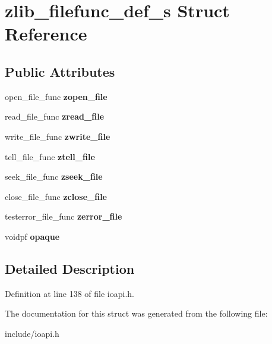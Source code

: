 \hypertarget{structzlib__filefunc__def__s}{\section{zlib\-\_\-filefunc\-\_\-def\-\_\-s Struct Reference}
\label{structzlib__filefunc__def__s}
}
\subsection*{Public Attributes}
\begin{DoxyCompactItemize}
\item 
\hypertarget{structzlib__filefunc__def__s_a49b78a559140e495b94af4d9dfe5c4e9}{open\-\_\-file\-\_\-func {\bfseries zopen\-\_\-file}}\label{structzlib__filefunc__def__s_a49b78a559140e495b94af4d9dfe5c4e9}

\item 
\hypertarget{structzlib__filefunc__def__s_ab14f748de7516525e5d2b78c47aca92e}{read\-\_\-file\-\_\-func {\bfseries zread\-\_\-file}}\label{structzlib__filefunc__def__s_ab14f748de7516525e5d2b78c47aca92e}

\item 
\hypertarget{structzlib__filefunc__def__s_a710b490fec793486ef5bedd9f2e1136d}{write\-\_\-file\-\_\-func {\bfseries zwrite\-\_\-file}}\label{structzlib__filefunc__def__s_a710b490fec793486ef5bedd9f2e1136d}

\item 
\hypertarget{structzlib__filefunc__def__s_ac8b933601443cdd83f8cc02004c77d0d}{tell\-\_\-file\-\_\-func {\bfseries ztell\-\_\-file}}\label{structzlib__filefunc__def__s_ac8b933601443cdd83f8cc02004c77d0d}

\item 
\hypertarget{structzlib__filefunc__def__s_a4747bdf97a3f44fe4b958114c11e1dcf}{seek\-\_\-file\-\_\-func {\bfseries zseek\-\_\-file}}\label{structzlib__filefunc__def__s_a4747bdf97a3f44fe4b958114c11e1dcf}

\item 
\hypertarget{structzlib__filefunc__def__s_ac46ac7ec0540dce117dab3f210d26763}{close\-\_\-file\-\_\-func {\bfseries zclose\-\_\-file}}\label{structzlib__filefunc__def__s_ac46ac7ec0540dce117dab3f210d26763}

\item 
\hypertarget{structzlib__filefunc__def__s_a61182b5b3ff83fb509b57ab4d2d9816d}{testerror\-\_\-file\-\_\-func {\bfseries zerror\-\_\-file}}\label{structzlib__filefunc__def__s_a61182b5b3ff83fb509b57ab4d2d9816d}

\item 
\hypertarget{structzlib__filefunc__def__s_a494b6d634b61bdc7fc7caed8e4fbe3f4}{voidpf {\bfseries opaque}}\label{structzlib__filefunc__def__s_a494b6d634b61bdc7fc7caed8e4fbe3f4}

\end{DoxyCompactItemize}


\subsection{Detailed Description}


Definition at line 138 of file ioapi.\-h.



The documentation for this struct was generated from the following file\-:\begin{DoxyCompactItemize}
\item 
include/ioapi.\-h\end{DoxyCompactItemize}
